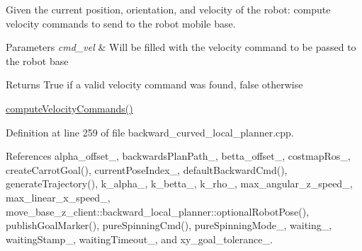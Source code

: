 Given the current position, orientation, and velocity of the robot\+: compute velocity commands to send to the robot mobile base. 


\begin{DoxyParams}{Parameters}
{\em cmd\+\_\+vel} & Will be filled with the velocity command to be passed to the robot base \\
\hline
\end{DoxyParams}
\begin{DoxyReturn}{Returns}
True if a valid velocity command was found, false otherwise
\end{DoxyReturn}
\hyperlink{classmove__base__z__client_1_1backward__local__planner_1_1BackwardLocalPlanner_a8e7dec0bc31856d814d8fa6df747bbb8}{compute\+Velocity\+Commands()} 

Definition at line 259 of file backward\+\_\+curved\+\_\+local\+\_\+planner.\+cpp.



References alpha\+\_\+offset\+\_\+, backwards\+Plan\+Path\+\_\+, betta\+\_\+offset\+\_\+, costmap\+Ros\+\_\+, create\+Carrot\+Goal(), current\+Pose\+Index\+\_\+, default\+Backward\+Cmd(), generate\+Trajectory(), k\+\_\+alpha\+\_\+, k\+\_\+betta\+\_\+, k\+\_\+rho\+\_\+, max\+\_\+angular\+\_\+z\+\_\+speed\+\_\+, max\+\_\+linear\+\_\+x\+\_\+speed\+\_\+, move\+\_\+base\+\_\+z\+\_\+client\+::backward\+\_\+local\+\_\+planner\+::optional\+Robot\+Pose(), publish\+Goal\+Marker(), pure\+Spinning\+Cmd(), pure\+Spinning\+Mode\+\_\+, waiting\+\_\+, waiting\+Stamp\+\_\+, waiting\+Timeout\+\_\+, and xy\+\_\+goal\+\_\+tolerance\+\_\+.


